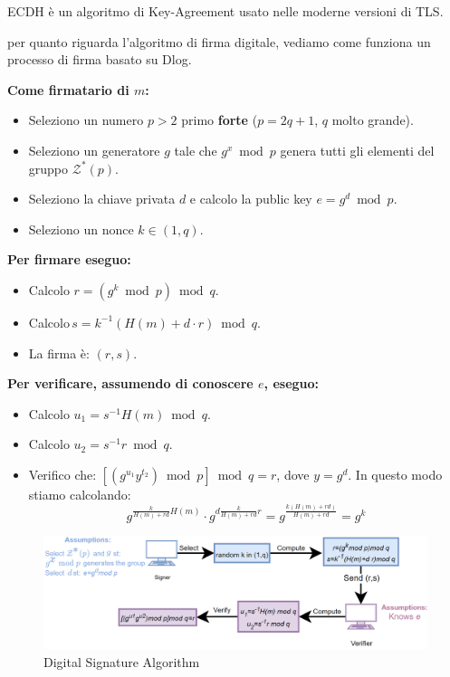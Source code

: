 \begin{note}
ECDH è un algoritmo di Key-Agreement usato nelle moderne versioni di TLS.
\end{note}
per quanto riguarda l'algoritmo di firma digitale, vediamo come funziona un processo di firma basato su Dlog.
\pagebreak
\begin{definition}
\textbf{Come firmatario di $m$:}
\begin{itemize}
    \item Seleziono un numero $p>2$ primo \textbf{forte} ($p=2q+1$, $q$ molto grande).
    \item Seleziono un generatore $g$ tale che $g^x\bmod p$ genera tutti gli elementi del gruppo $\mathcal{Z}^*(p)$.
    \item Seleziono la chiave privata $d$ e calcolo la public key $e=g^d\bmod p$.
    \item Seleziono un nonce $k\in(1,q)$.
\end{itemize}
\textbf{Per firmare eseguo:}
\begin{itemize}
    \item Calcolo $r=(g^k\bmod p)\bmod q$.
    \item Calcolo\footnotemark \,$s=k^{-1}(H(m)+d\cdot r)\bmod q$.
    \item La firma è: $(r,s)$.
\end{itemize}
\textbf{Per verificare, assumendo di conoscere $e$, eseguo:}
\begin{itemize}
    \item Calcolo $u_1=s^{-1}H(m)\bmod q$.
    \item Calcolo $u_2=s^{-1}r\bmod q$.
    \item Verifico che: $[(g^{u_1}y^{t_2})\bmod p]\bmod q=r$, dove $y=g^d$. In questo modo stiamo calcolando:
    \[
    g^{\frac{k}{H(m)+rd}H(m)}\cdot g^{d\frac{k}{H(m)+rd}r}=g^{\frac{k(H(m)+rd)}{H(m)+rd}}=g^k
    \]
\end{itemize}
\end{definition}
\begin{figure}[h]
    \centering
    \includegraphics{image/ecc/dsa.png}
    \caption{Digital Signature Algorithm}
    \label{fig:dsa}
\end{figure}
